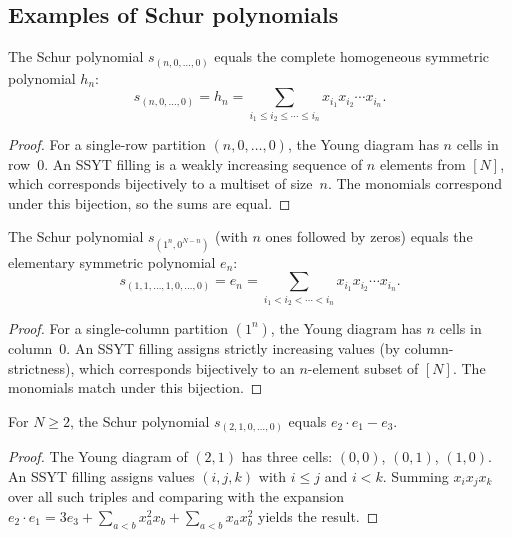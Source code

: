 \subsection{Examples of Schur polynomials}

\begin{theorem}
\label{thm.sf.schur-row-eq-h}
\leanhelper
\leanok
The Schur polynomial $s_{(n,0,\ldots,0)}$ equals the complete homogeneous symmetric
polynomial $h_n$:
\[
  s_{(n,0,\ldots,0)} = h_n = \sum_{i_1 \le i_2 \le \cdots \le i_n} x_{i_1} x_{i_2} \cdots x_{i_n}.
\]
\end{theorem}

\begin{proof}
For a single-row partition $(n,0,\ldots,0)$, the Young diagram has $n$ cells in row~0.
An SSYT filling is a weakly increasing sequence of $n$ elements from $[N]$,
which corresponds bijectively to a multiset of size~$n$.
The monomials correspond under this bijection, so the sums are equal.
\end{proof}

\begin{theorem}
\label{thm.sf.schur-col-eq-e}
\leanhelper
\leanok
The Schur polynomial $s_{(1^n, 0^{N-n})}$ (with $n$ ones followed by zeros) equals the
elementary symmetric polynomial $e_n$:
\[
  s_{(1,1,\ldots,1,0,\ldots,0)} = e_n = \sum_{i_1 < i_2 < \cdots < i_n} x_{i_1} x_{i_2} \cdots x_{i_n}.
\]
\end{theorem}

\begin{proof}
For a single-column partition $(1^n)$, the Young diagram has $n$ cells in column~0.
An SSYT filling assigns strictly increasing values (by column-strictness), which
corresponds bijectively to an $n$-element subset of $[N]$.
The monomials match under this bijection.
\end{proof}

\begin{theorem}
\label{thm.sf.schur-21-eq}
\leanhelper
\leanok
For $N \ge 2$, the Schur polynomial $s_{(2,1,0,\ldots,0)}$ equals
$e_2 \cdot e_1 - e_3$.
\end{theorem}

\begin{proof}
\leanok
The Young diagram of $(2,1)$ has three cells: $(0,0)$, $(0,1)$, $(1,0)$.
An SSYT filling assigns values $(i, j, k)$ with $i \le j$ and $i < k$.
Summing $x_i x_j x_k$ over all such triples and comparing with
the expansion $e_2 \cdot e_1 = 3 e_3 + \sum_{a<b} x_a^2 x_b + \sum_{a<b} x_a x_b^2$
yields the result.
\end{proof}

